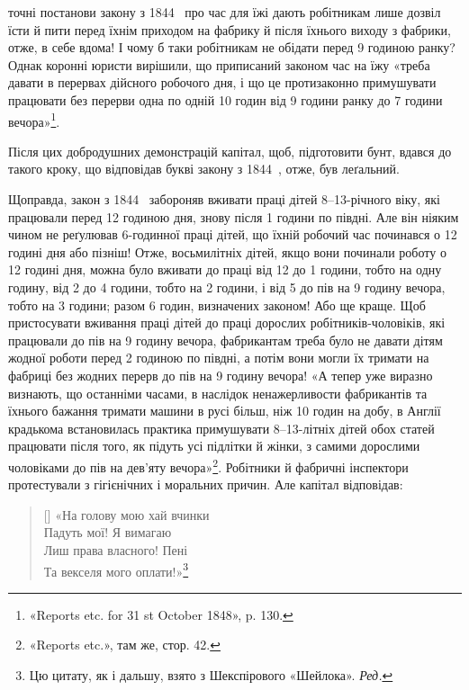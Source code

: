 \parcont{}  %
точні постанови закону з 1844~ про час для їжі дають робітникам
лише дозвіл їсти й пити перед їхнім приходом на фабрику
й після їхнього виходу з фабрики, отже, в себе вдома! І чому б
таки робітникам не обідати перед 9 годиною ранку? Однак коронні
юристи вирішили, що приписаний законом час на їжу «треба
давати в перервах дійсного робочого дня, і що це протизаконно
примушувати працювати без перерви одна по одній 10 годин
від 9 години ранку до 7 години вечора»\footnote{
«Reports etc. for 31 st October 1848», p. 130.
}.

Після цих добродушних демонстрацій капітал, щоб, підготовити
бунт, вдався до такого кроку, що відповідав букві закону
з 1844~, отже, був леґальний.

Щоправда, закон з 1844~ забороняв вживати праці дітей 8--13-річного
віку, які працювали перед 12 годиною дня, знову після
1 години по півдні. Але він ніяким чином не реґулював 6-годинної
праці дітей, що їхній робочий час починався о 12 годині
дня або пізніш! Отже, восьмилітніх дітей, якщо вони починали
роботу о 12 годині дня, можна було вживати до праці від 12 до
1 години, тобто на одну годину, від 2 до 4 години, тобто на 2 години,
і від 5 до пів на 9 годину вечора, тобто на 3 години; разом
6 годин, визначених законом! Або ще краще. Щоб пристосувати
вживання праці дітей до праці дорослих робітників-чоловіків, які
працювали до пів на 9 годину вечора, фабрикантам треба було не
давати дітям жодної роботи перед 2 годиною по півдні, а потім вони
могли їх тримати на фабриці без жодних перерв до пів на 9 годину
вечора! «А тепер уже виразно визнають, що останніми часами,
в наслідок ненажерливости фабрикантів та їхнього бажання тримати
машини в русі більш, ніж 10 годин на добу, в Англії крадькома
встановилась практика примушувати 8--13-літніх дітей
обох статей працювати після того, як підуть усі підлітки й жінки,
з самими дорослими чоловіками до пів на дев’яту вечора»\footnote{
«Reports etc.», там же, стор. 42.
}.
Робітники й фабричні інспектори протестували з гігієнічних і
моральних причин. Але капітал відповідав:
\vspace{-\medskipamount}
\settowidth{\versewidth}{«На голову мою хай вчинки}
\begin{verse}[\versewidth]
«На голову мою хай вчинки \\
Падуть мої! Я вимагаю \\
Лиш права власного! Пені \\
Та векселя мого оплати!»\footnote*{
Цю цитату, як і дальшу, взято з Шекспірового «Шейлока». \emph{Ред.}
}
\end{verse}
\vspace{-\medskipamount}

